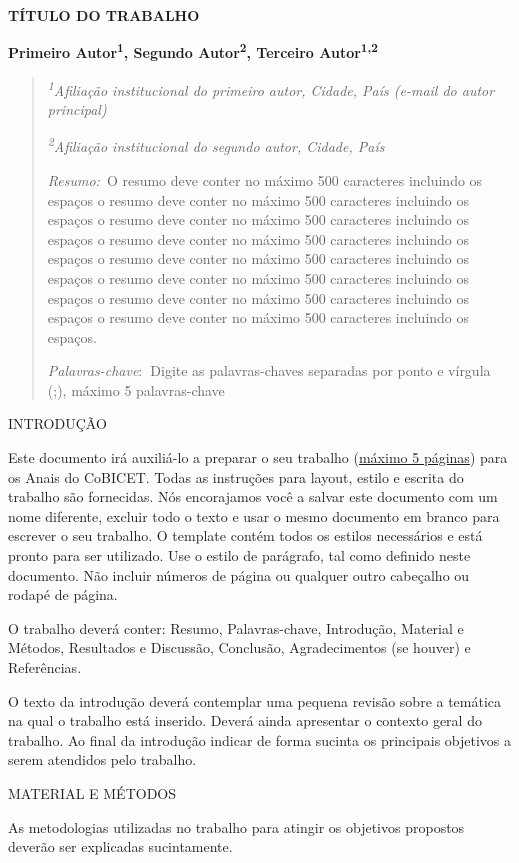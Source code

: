 \documentclass[
]{article}
\author{}
\date{}
\begin{document}
\textbf{TÍTULO DO TRABALHO}

\textbf{Primeiro Autor\textsuperscript{1}, Segundo
Autor\textsuperscript{2}, Terceiro Autor\textsuperscript{1,2}}

\begin{quote}
\emph{\textsuperscript{1}Afiliação institucional do primeiro autor,
Cidade, País (e-mail do autor principal)}

\emph{\textsuperscript{2}Afiliação institucional do segundo autor,
Cidade, País}

\emph{Resumo:}~O resumo deve conter no máximo 500 caracteres incluindo
os espaços o resumo deve conter no máximo 500 caracteres incluindo os
espaços o resumo deve conter no máximo 500 caracteres incluindo os
espaços o resumo deve conter no máximo 500 caracteres incluindo os
espaços o resumo deve conter no máximo 500 caracteres incluindo os
espaços o resumo deve conter no máximo 500 caracteres incluindo os
espaços o resumo deve conter no máximo 500 caracteres incluindo os
espaços o resumo deve conter no máximo 500 caracteres incluindo os
espaços.

\emph{Palavras-chave}:\textbf{~}Digite as palavras-chaves separadas por
ponto e vírgula (;), máximo 5 palavras-chave
\end{quote}

INTRODUÇÃO

Este documento irá auxiliá-lo a preparar o seu trabalho (\ul{máximo 5
páginas}) para os Anais do CoBICET. Todas as instruções para layout,
estilo e escrita do trabalho são fornecidas. Nós encorajamos você a
salvar este documento com um nome diferente, excluir todo o texto e usar
o mesmo documento em branco para escrever o seu trabalho. O template
contém todos os estilos necessários e está pronto para ser utilizado.
Use o estilo de parágrafo, tal como definido neste documento. Não
incluir números de página ou qualquer outro cabeçalho ou rodapé de
página.

O trabalho deverá conter: Resumo, Palavras-chave, Introdução, Material e
Métodos, Resultados e Discussão, Conclusão, Agradecimentos (se houver) e
Referências.

O texto da introdução deverá contemplar uma pequena revisão sobre a
temática na qual o trabalho está inserido. Deverá ainda apresentar o
contexto geral do trabalho. Ao final da introdução indicar de forma
sucinta os principais objetivos a serem atendidos pelo trabalho.

MATERIAL E MÉTODOS

As metodologias utilizadas no trabalho para atingir os objetivos
propostos deverão ser explicadas sucintamente.
\end{document}
